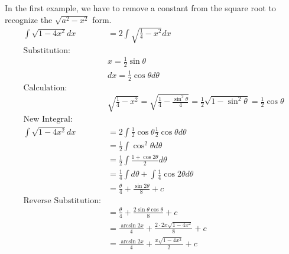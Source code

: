 \documentclass[fleqn]{report}
\begin{document}
\begin{example}
In the first example, we have to remove a constant from the
square root to recognize the $\sqrt{a^2 - x^2}$ form. 
\begin{align*}
\int \sqrt{1-4x^2} dx & = 2 \int \sqrt{\frac{1}{4} - x^2} dx \\
\text{Substitution:} & \\
& x = \frac{1}{2} \sin \theta \\
& dx = \frac{1}{2} \cos \theta d \theta \\
\text{Calculation:} & \\
& \sqrt{\frac{1}{4} - x^2} = \sqrt{\frac{1}{4} - \frac{\sin^2
\theta}{4}} = \frac{1}{2} \sqrt{1 - \sin^2 \theta} = \frac{1}{2}
\cos \theta \\
\text{New Integral:} & \\
\int \sqrt{1-4x^2} dx & = 2 \int \frac{1}{2} \cos \theta
\frac{1}{2} \cos \theta d \theta \\
& = \frac{1}{2} \int \cos^2 \theta d\theta \\
& = \frac{1}{2} \int \frac{1 + \cos 2 \theta}{2} d\theta \\
& = \frac{1}{4} \int d \theta + \int \frac{1}{4} \cos 2 \theta
d\theta \\
& = \frac{\theta}{4} + \frac{\sin 2\theta}{8} + c \\
\text{Reverse Substitution:} & \\
& = \frac{\theta}{4} + \frac{2 \sin \theta \cos \theta}{8} +
c \\
& = \frac{\arcsin 2x}{4} + \frac{2\cdot 2x \sqrt{1-4x^2}}{8} + c
\\
& = \frac{\arcsin 2x}{4} + \frac{x\sqrt{1-4x^2}}{2} + c 
\end{align*}
\end{example}
\end{document}
